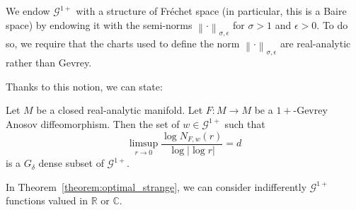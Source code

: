\documentclass[AHL,Unicode,longabstracts,published]{cedram}
\newcommand{\n}[1]{\left\|#1\right\|}
\newcommand{\va}[1]{\left|#1\right|}
\newcommand{\clG}{\mathcal{G}}
\newcommand{\bbC}{\mathbb{C}}
\newcommand{\bbR}{\mathbb{R}}
\begin{document}
We endow $\clG^{1+}$ with a structure of Fréchet space (in particular, this is a Baire space) by endowing it with the semi-norms $\n{\cdot}_{\sigma,\epsilon}$ for $\sigma > 1$ and $\epsilon > 0$. To do so, we require that the charts used to define the norm $\n{\cdot}_{\sigma,\epsilon}$ are real-analytic rather than Gevrey.

Thanks to this notion, we can state:

\begin{theo}\label{theorem:optimal_strange}
Let $M$ be a closed real-analytic manifold. Let $F: M \to M$ be a $1+$-Gevrey Anosov diffeomorphism. Then the set of $w \in \clG^{1+}$ such that
\begin{equation}\label{eq:equality_optimal}
\limsup_{r \to 0} \frac{\log N_{F,w}(r)}{\log \va{\log r}} = d
\end{equation}
is a $G_\delta$ dense subset of $\clG^{1+}$.
\end{theo}

In Theorem~\ref{theorem:optimal_strange}, we can consider indifferently $\clG^{1+}$ functions valued in $\bbR$ or $\bbC$.
\end{document}
